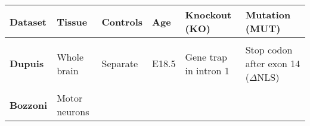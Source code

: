 \begin{longtable}[]{@{}llllll@{}}
	\begin{minipage}[t]{0.14\columnwidth}\raggedright\strut
		{\textbf{Dataset}}\strut
	\end{minipage} & \begin{minipage}[t]{0.14\columnwidth}\raggedright\strut
		{\textbf{Tissue}}\strut
	\end{minipage} & \begin{minipage}[t]{0.12\columnwidth}\raggedright\strut
		{\textbf{Controls}}\strut
	\end{minipage} & \begin{minipage}[t]{0.10\columnwidth}\raggedright\strut
		{\textbf{Age}}\strut
	\end{minipage} & \begin{minipage}[t]{0.14\columnwidth}\raggedright\strut
		{\textbf{Knockout (KO)}}\strut
	\end{minipage} & \begin{minipage}[t]{0.14\columnwidth}\raggedright\strut
		{\textbf{Mutation (MUT)}}\strut
	\end{minipage}\tabularnewline\hline \\ 
	\begin{minipage}[t]{0.16\columnwidth}\raggedright\strut
		{\textbf{Dupuis}}
		{\footnotesize\citep{Scekic-zahirovic2016}}\strut
	\end{minipage} & \begin{minipage}[t]{0.14\columnwidth}\raggedright\strut
		{Whole brain}\strut
	\end{minipage} & \begin{minipage}[t]{0.12\columnwidth}\raggedright\strut
		{Separate}\strut
	\end{minipage} & \begin{minipage}[t]{0.10\columnwidth}\raggedright\strut
		{E18.5}\strut
	\end{minipage} & \begin{minipage}[t]{0.16\columnwidth}\raggedright\strut
		{Gene trap in intron 1}\strut
	\end{minipage} & \begin{minipage}[t]{0.16\columnwidth}\raggedright\strut
		{Stop codon after exon 14 ($\Delta$NLS)}\strut
	\end{minipage}\tabularnewline \\
	\begin{minipage}[t]{0.16\columnwidth}\raggedright\strut
		{\textbf{Bozzoni}}
		{\footnotesize\citep{Capauto2018}}\strut
	\end{minipage} & \begin{minipage}[t]{0.14\columnwidth}\raggedright\strut
		{Motor neurons}
		

\end{minipage}
\end{longtable}
